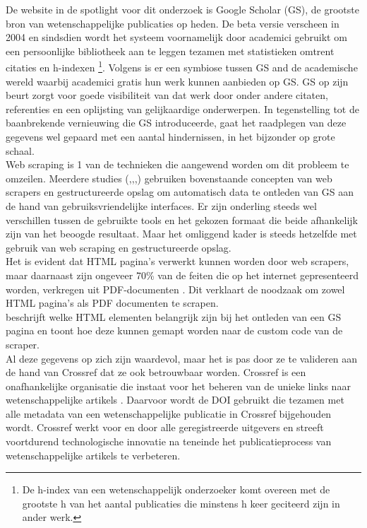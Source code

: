 De website in de spotlight voor dit onderzoek is Google Scholar (GS), de grootste bron van wetenschappelijke publicaties op heden. De beta versie verscheen in 2004 en sindsdien wordt het systeem voornamelijk door academici gebruikt om een persoonlijke bibliotheek aan te leggen tezamen met statistieken omtrent citaties en h-indexen \footnote{De h-index van een wetenschappelijk onderzoeker komt overeen met de grootste h van het aantal publicaties die minstens h keer geciteerd zijn in ander werk.}. Volgens \textcite{Oh2019} is er een symbiose tussen GS and de academische wereld waarbij academici gratis hun werk kunnen aanbieden op GS. GS op zijn beurt zorgt voor goede visibiliteit van dat werk door onder andere citaten, referenties en een oplijsting van gelijkaardige onderwerpen. In tegenstelling tot de baanbrekende vernieuwing die GS introduceerde, gaat het raadplegen van deze gegevens wel gepaard met een aantal hindernissen, in het bijzonder op grote schaal.\\
Web scraping is 1 van de technieken die aangewend worden om dit probleem te omzeilen. Meerdere studies (\autocite{Pratiba2018},\autocite{Rafsanjani2022},\autocite{Amin2024},\autocite{Sulistya2024}) gebruiken bovenstaande concepten van web scrapers en gestructureerde opslag om automatisch data te ontleden van GS aan de hand van gebruiksvriendelijke interfaces. Er zijn onderling steeds wel verschillen tussen de gebruikte tools en het gekozen formaat die beide afhankelijk zijn van het beoogde resultaat. Maar het omliggend kader is steeds hetzelfde met gebruik van web scraping en gestructureerde opslag.\\
Het is evident dat HTML pagina's verwerkt kunnen worden door web scrapers, maar daarnaast zijn ongeveer 70\% van de feiten die op het internet gepresenteerd worden, verkregen uit PDF-documenten \autocite{Singrodia2019}. Dit verklaart de noodzaak om zowel HTML pagina's als PDF documenten te scrapen.\\
\textcite{Yang2017} beschrijft welke HTML elementen belangrijk zijn bij het ontleden van een GS pagina en \textcite{Rahmatulloh2020} toont hoe deze kunnen gemapt worden naar de custom code van de scraper.\\
Al deze gegevens op zich zijn waardevol, maar het is pas door ze te valideren aan de hand van Crossref dat ze ook betrouwbaar worden. Crossref is een onafhankelijke organisatie die instaat voor het beheren van de unieke links naar wetenschappelijke artikels \autocite{Hendricks2020}. Daarvoor wordt de DOI gebruikt die tezamen met alle metadata van een wetenschappelijke publicatie in Crossref bijgehouden wordt. Crossref werkt voor en door alle geregistreerde uitgevers en streeft voortdurend technologische innovatie na teneinde het publicatieprocess van wetenschappelijke artikels te verbeteren.
